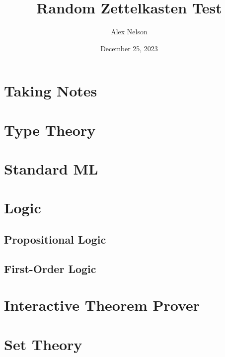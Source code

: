 \documentclass[dvipsnames,HTML]{amsbook}
\title{Random Zettelkasten Test}
\author{Alex Nelson}
\date{December 25, 2023}
\begin{document}
\frontmatter
\maketitle
\tableofcontents
\mainmatter
\vfill\eject
\chapter{Taking Notes}


\chapter{Type Theory}


\chapter{Standard ML}


\chapter{Logic}
\section{Propositional Logic}

\section{First-Order Logic}


\chapter{Interactive Theorem Prover}


\chapter{Set Theory}

% 

\backmatter
\nocite{*}

\end{document}
